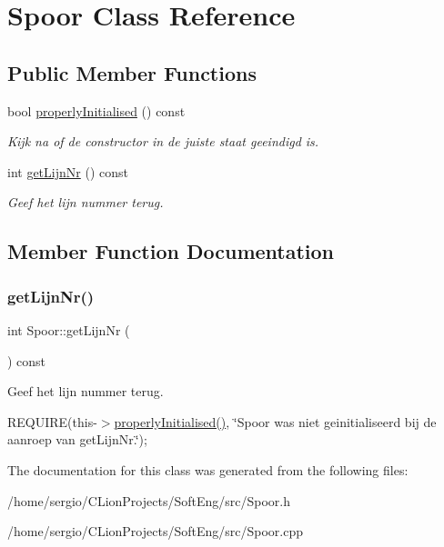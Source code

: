 \hypertarget{class_spoor}{}\section{Spoor Class Reference}
\label{class_spoor}
\subsection*{Public Member Functions}
\begin{DoxyCompactItemize}
\item 
\mbox{\label{class_spoor_a1eb7c54228676cdb7c8620104e063a3c}} 
bool \hyperlink{class_spoor_a1eb7c54228676cdb7c8620104e063a3c}{properly\+Initialised} () const
\begin{DoxyCompactList}\small\item\em Kijk na of de constructor in de juiste staat geeindigd is. \end{DoxyCompactList}\item 
int \hyperlink{class_spoor_a66ebc0abcb370b1509bd7b3961a8e45a}{get\+Lijn\+Nr} () const
\begin{DoxyCompactList}\small\item\em Geef het lijn nummer terug. \end{DoxyCompactList}\end{DoxyCompactItemize}


\subsection{Member Function Documentation}
\mbox{\label{class_spoor_a66ebc0abcb370b1509bd7b3961a8e45a}} 
\subsubsection{\texorpdfstring{get\+Lijn\+Nr()}{getLijnNr()}}
{\footnotesize\ttfamily int Spoor\+::get\+Lijn\+Nr (\begin{DoxyParamCaption}{ }\end{DoxyParamCaption}) const}



Geef het lijn nummer terug. 

R\+E\+Q\+U\+I\+RE(this-\/$>$\hyperlink{class_spoor_a1eb7c54228676cdb7c8620104e063a3c}{properly\+Initialised()}, \char`\"{}\+Spoor was niet geinitialiseerd bij de aanroep van get\+Lijn\+Nr.\char`\"{});~\newline


The documentation for this class was generated from the following files\+:\begin{DoxyCompactItemize}
\item 
/home/sergio/\+C\+Lion\+Projects/\+Soft\+Eng/src/Spoor.\+h\item 
/home/sergio/\+C\+Lion\+Projects/\+Soft\+Eng/src/Spoor.\+cpp\end{DoxyCompactItemize}
